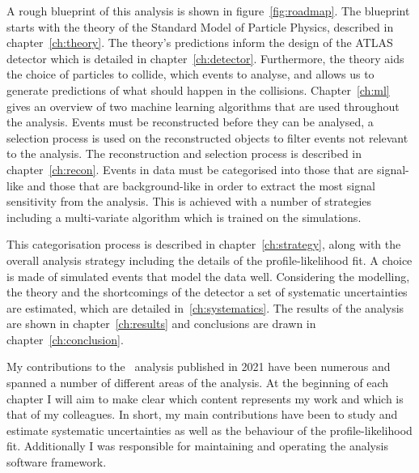 A rough blueprint of this analysis is shown in figure~\ref{fig:roadmap}.%
 The blueprint starts with the theory of
the Standard Model of Particle Physics, described in chapter~\ref{ch:theory}.
The theory's predictions inform the design of the ATLAS detector which is
detailed in chapter~\ref{ch:detector}. Furthermore, the theory aids the choice
of particles to collide, which events to analyse, and allows us to generate
predictions of what should happen in the collisions. Chapter~\ref{ch:ml} gives
an overview of two machine learning algorithms that are used throughout the
analysis. Events must be reconstructed before they can be analysed, a selection
process is used on the reconstructed objects to filter events not relevant to
the analysis. The reconstruction and selection process is described in
chapter~\ref{ch:recon}. Events in data must be categorised into those that are
signal-like and those that are background-like in order to extract the most
signal sensitivity from the analysis. This is achieved with a number of
strategies including a multi-variate algorithm which is trained on the
simulations.

This categorisation process is described in chapter~\ref{ch:strategy}, along
with the overall analysis strategy including the details of the
profile-likelihood fit. A choice is made of simulated events that model the
data well. Considering the modelling, the theory and the shortcomings of the detector
a set of systematic uncertainties are estimated, which are detailed
in~\ref{ch:systematics}. The results of the analysis are shown in
chapter~\ref{ch:results} and conclusions are drawn in
chapter~\ref{ch:conclusion}.

My contributions to the \VHbb\ analysis published in 2021 have been numerous and
spanned a number of different areas of the analysis. At the beginning of each
chapter I will aim to make clear which content represents my work and which is
that of my colleagues. In short, my main contributions have been to study and
estimate systematic uncertainties as well as the behaviour of the
profile-likelihood fit. Additionally I was responsible for maintaining and
operating the analysis software framework.

